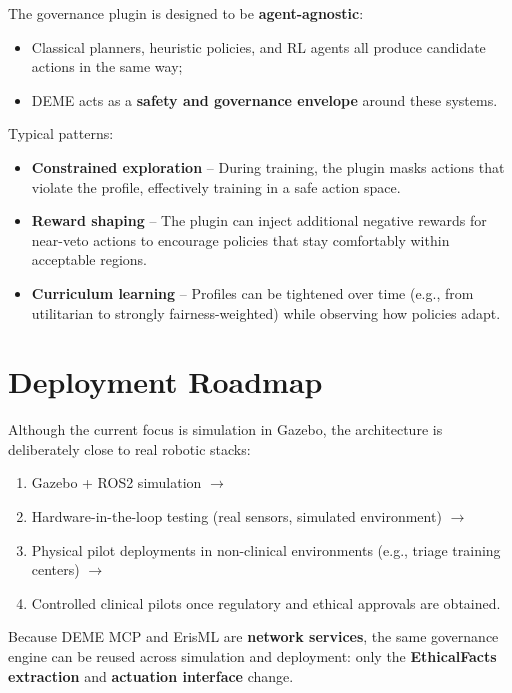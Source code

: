 \documentclass[11pt]{article}
\begin{document}
The governance plugin is designed to be \textbf{agent-agnostic}:

\begin{itemize}
  \item Classical planners, heuristic policies, and RL agents all produce candidate actions in the same way;
  \item DEME acts as a \textbf{safety and governance envelope} around these systems.
\end{itemize}

Typical patterns:

\begin{itemize}
  \item \textbf{Constrained exploration} -- During training, the plugin masks actions that violate the profile, effectively training in a safe action space.
  \item \textbf{Reward shaping} -- The plugin can inject additional negative rewards for near-veto actions to encourage policies that stay comfortably within acceptable regions.
  \item \textbf{Curriculum learning} -- Profiles can be tightened over time (e.g., from utilitarian to strongly fairness-weighted) while observing how policies adapt.
\end{itemize}

\section{Deployment Roadmap}

Although the current focus is simulation in Gazebo, the architecture is deliberately close to real robotic stacks:

\begin{enumerate}
  \item Gazebo + ROS2 simulation $\to$
  \item Hardware-in-the-loop testing (real sensors, simulated environment) $\to$
  \item Physical pilot deployments in non-clinical environments (e.g., triage training centers) $\to$
  \item Controlled clinical pilots once regulatory and ethical approvals are obtained.
\end{enumerate}

Because DEME MCP and ErisML are \textbf{network services}, the same governance engine can be reused across simulation and deployment: only the \textbf{EthicalFacts extraction} and \textbf{actuation interface} change.
\end{document}
